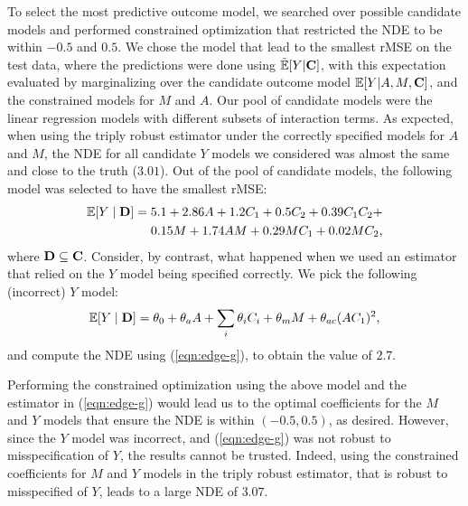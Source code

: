 \documentclass[letterpaper]{article} %
\begin{document}
To select the most predictive outcome model, we searched over possible candidate models and performed constrained optimization that restricted the NDE to be within $-0.5$ and $0.5$. We chose the model that lead to the smallest rMSE on the test data, where the predictions were done using
$\tilde{\mathbb{E}}[Y | {\bf C}]$, with this expectation evaluated by marginalizing over the candidate outcome model $\mathbb{E}[Y | A,M,{\bf C}]$, and the constrained models for
$M$ and $A$.  Our pool of candidate models were the linear regression models with different subsets of interaction terms. 
As expected, when using the triply robust estimator under the correctly specified models for $A$ and $M$,
the NDE for all candidate $Y$ models we considered was almost the same and close to the truth ($3.01$).
Out of the pool of candidate models, the following model was selected to have the smallest rMSE:
{\small
\begin{align}
\mathbb{E}[Y \mid {\bf D}] 
= 5.1 + 2.86 A + 1.2 C_1 + 0.5 C_2 +  0.39 C_1 C_2 + \nonumber \\
 0.15 M + 1.74 AM + 0.29 MC_1 + 0.02 M C_2,   \nonumber 
\end{align}
}
where ${\bf D} \subseteq {\bf C}$.
Consider, by contrast, what happened when we used an estimator that relied on the $Y$ model being specified correctly.
We pick the following (incorrect) $Y$ model:
{\small
\begin{align}
\mathbb{E}[Y \mid {\bf D}] 
= \theta_0 + \theta_a A + \sum_{i}\theta_{i} C_i  + \theta_m M + \theta_{ac} (AC_1)^2, \nonumber 
\end{align}
}
and compute the NDE using (\ref{eqn:edge-g}), to obtain the value of $2.7$. 

Performing the constrained optimization using the above model and the estimator in (\ref{eqn:edge-g}) would lead us to the optimal coefficients for the $M$ and $Y$ models that ensure the NDE is within $(-0.5,0.5)$, as desired.  However, since the $Y$ model was incorrect, and (\ref{eqn:edge-g}) was not robust to misspecification of $Y$, the results cannot be trusted.  Indeed, using the constrained coefficients for $M$ and $Y$ models in the triply robust estimator, that is robust to misspecified of $Y$, leads to a large NDE of $3.07$.
\end{document}
